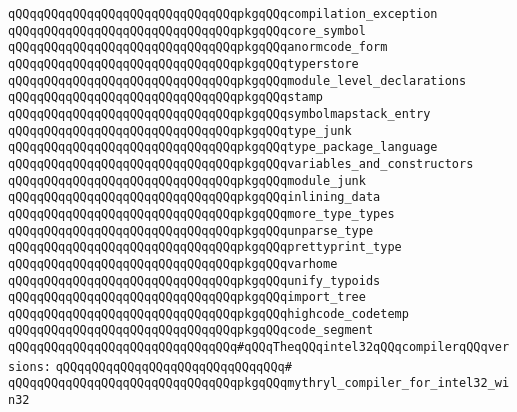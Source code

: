 \verb|qQQqqQQqqQQqqQQqqQQqqQQqqQQqqQQqpkgqQQqcompilation_exception|\newline
\verb|qQQqqQQqqQQqqQQqqQQqqQQqqQQqqQQqpkgqQQqcore_symbol|\newline
\verb|qQQqqQQqqQQqqQQqqQQqqQQqqQQqqQQqpkgqQQqanormcode_form|\newline
\newline
\verb|qQQqqQQqqQQqqQQqqQQqqQQqqQQqqQQqpkgqQQqtyperstore|\newline
\verb|qQQqqQQqqQQqqQQqqQQqqQQqqQQqqQQqpkgqQQqmodule_level_declarations|\newline
\verb|qQQqqQQqqQQqqQQqqQQqqQQqqQQqqQQqpkgqQQqstamp|\newline
\verb|qQQqqQQqqQQqqQQqqQQqqQQqqQQqqQQqpkgqQQqsymbolmapstack_entry|\newline
\verb|qQQqqQQqqQQqqQQqqQQqqQQqqQQqqQQqpkgqQQqtype_junk|\newline
\verb|qQQqqQQqqQQqqQQqqQQqqQQqqQQqqQQqpkgqQQqtype_package_language|\newline
\verb|qQQqqQQqqQQqqQQqqQQqqQQqqQQqqQQqpkgqQQqvariables_and_constructors|\newline
\verb|qQQqqQQqqQQqqQQqqQQqqQQqqQQqqQQqpkgqQQqmodule_junk|\newline
\verb|qQQqqQQqqQQqqQQqqQQqqQQqqQQqqQQqpkgqQQqinlining_data|\newline
\verb|qQQqqQQqqQQqqQQqqQQqqQQqqQQqqQQqpkgqQQqmore_type_types|\newline
\verb|qQQqqQQqqQQqqQQqqQQqqQQqqQQqqQQqpkgqQQqunparse_type|\newline
\verb|qQQqqQQqqQQqqQQqqQQqqQQqqQQqqQQqpkgqQQqprettyprint_type|\newline
\verb|qQQqqQQqqQQqqQQqqQQqqQQqqQQqqQQqpkgqQQqvarhome|\newline
\verb|qQQqqQQqqQQqqQQqqQQqqQQqqQQqqQQqpkgqQQqunify_typoids|\newline
\verb|qQQqqQQqqQQqqQQqqQQqqQQqqQQqqQQqpkgqQQqimport_tree|\newline
\verb|qQQqqQQqqQQqqQQqqQQqqQQqqQQqqQQqpkgqQQqhighcode_codetemp|\newline
\verb|qQQqqQQqqQQqqQQqqQQqqQQqqQQqqQQqpkgqQQqcode_segment|\newline
\newline
\verb|qQQqqQQqqQQqqQQqqQQqqQQqqQQqqQQq#qQQqTheqQQqintel32qQQqcompilerqQQqversions:|\newline
\verb|qQQqqQQqqQQqqQQqqQQqqQQqqQQqqQQq#|\newline
\verb|qQQqqQQqqQQqqQQqqQQqqQQqqQQqqQQqpkgqQQqmythryl_compiler_for_intel32_win32|\newline
